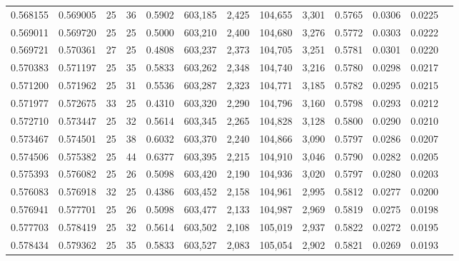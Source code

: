 \begin{tabular}{rrrrrrrrrrrrr}
0.568155 & 0.569005 &    25 &  36 &                                     0.5902 & 603,185 &   2,425 & 104,655 &   3,301 & 0.5765 & 0.0306 & 0.0225 \\
0.569011 & 0.569720 &    25 &  25 &                                     0.5000 & 603,210 &   2,400 & 104,680 &   3,276 & 0.5772 & 0.0303 & 0.0222 \\
0.569721 & 0.570361 &    27 &  25 &                                     0.4808 & 603,237 &   2,373 & 104,705 &   3,251 & 0.5781 & 0.0301 & 0.0220 \\
0.570383 & 0.571197 &    25 &  35 &                                     0.5833 & 603,262 &   2,348 & 104,740 &   3,216 & 0.5780 & 0.0298 & 0.0217 \\
0.571200 & 0.571962 &    25 &  31 &                                     0.5536 & 603,287 &   2,323 & 104,771 &   3,185 & 0.5782 & 0.0295 & 0.0215 \\
0.571977 & 0.572675 &    33 &  25 &                                     0.4310 & 603,320 &   2,290 & 104,796 &   3,160 & 0.5798 & 0.0293 & 0.0212 \\
0.572710 & 0.573447 &    25 &  32 &                                     0.5614 & 603,345 &   2,265 & 104,828 &   3,128 & 0.5800 & 0.0290 & 0.0210 \\
0.573467 & 0.574501 &    25 &  38 &                                     0.6032 & 603,370 &   2,240 & 104,866 &   3,090 & 0.5797 & 0.0286 & 0.0207 \\
0.574506 & 0.575382 &    25 &  44 &                                     0.6377 & 603,395 &   2,215 & 104,910 &   3,046 & 0.5790 & 0.0282 & 0.0205 \\
0.575393 & 0.576082 &    25 &  26 &                                     0.5098 & 603,420 &   2,190 & 104,936 &   3,020 & 0.5797 & 0.0280 & 0.0203 \\
0.576083 & 0.576918 &    32 &  25 &                                     0.4386 & 603,452 &   2,158 & 104,961 &   2,995 & 0.5812 & 0.0277 & 0.0200 \\
0.576941 & 0.577701 &    25 &  26 &                                     0.5098 & 603,477 &   2,133 & 104,987 &   2,969 & 0.5819 & 0.0275 & 0.0198 \\
0.577703 & 0.578419 &    25 &  32 &                                     0.5614 & 603,502 &   2,108 & 105,019 &   2,937 & 0.5822 & 0.0272 & 0.0195 \\
0.578434 & 0.579362 &    25 &  35 &                                     0.5833 & 603,527 &   2,083 & 105,054 &   2,902 & 0.5821 & 0.0269 & 0.0193 \\

\end{tabular}
